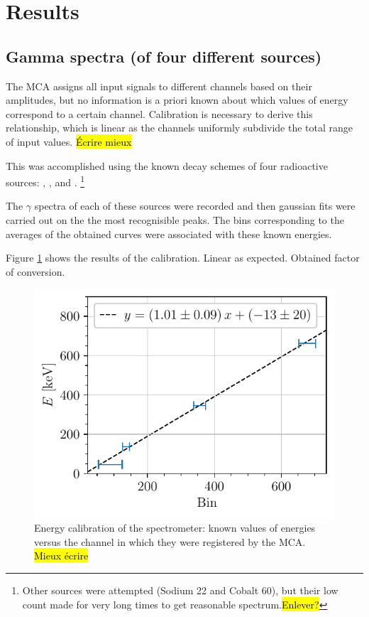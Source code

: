 \section{Results}
\subsection{Gamma spectra (of four different sources)}
The MCA assigns all input signals to different channels based on their amplitudes, but no information is a priori known about which values of energy correspond to a certain channel.
Calibration is necessary to derive this relationship, which is linear
as the channels uniformly subdivide the total range of input values. \hl{Écrire mieux}

This was accomplished using the known decay schemes\cite{notice_generale} of four radioactive sources: \cesium, \cobalt, \lead and \hafnium.
\footnote{Other sources were attempted (Sodium 22 and Cobalt 60), but their low count made for very long times to get reasonable spectrum.\hl{Enlever?}}

The $\gamma$ spectra of each of these sources were recorded and then gaussian fits were carried out on the the most recognisible peaks.
The bins corresponding to the averages of the obtained curves were associated with these known energies.

Figure \ref{fig:calibration_energy} shows the results of the calibration.
Linear as expected. Obtained factor of conversion.
\begin{figure}[htbp]
    \centering
    \includegraphics[scale=1]{figures/calibration_energy.pdf}
    \caption{Energy calibration of the spectrometer: known values of energies versus the channel in which they were registered by the MCA. \hl{Mieux écrire}}
    \label{fig:calibration_energy}
\end{figure}

